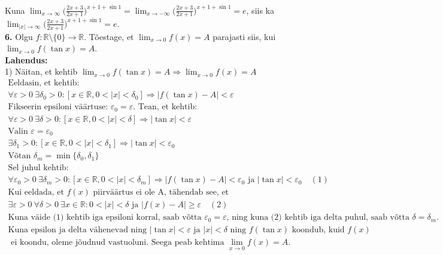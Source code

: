 \documentclass{article}
\begin{document}
Kuna $\displaystyle\lim_{x\to\infty} \bigg( \frac{2x+3}{2x+1}\bigg)^{x+1+\sin 1}= \displaystyle\lim_{x\to-\infty} \bigg( \frac{2x+3}{2x+1}\bigg)^{x+1+\sin 1}=e$, siis ka $\displaystyle\lim_{|x|\to\infty} \bigg( \frac{2x+3}{2x+1}\bigg)^{x+1+\sin 1}=e$.
\pagebreak\\
\textbf{6.} Olgu $f:\mathbb{R}\setminus \{0\}\to \mathbb{R}$. T\~oestage, et $\displaystyle\lim_{x\to0}f(x)=A$ parajasti siis, kui $\displaystyle\lim_{x\to0} f(\tan x)=A$.\\
\textbf{Lahendus:}\\
1) N\"aitan, et kehtib $\displaystyle\lim_{x\to0} f(\tan x)=A\Rightarrow\displaystyle\lim_{x\to0}f(x)=A$\\
\begin{gather*}
\text{Eeldasin, et kehtib:}\\
\forall \varepsilon>0\ \exists \delta_0>0:[x\in \mathbb{R}, 0<|x|<\delta_0]\Rightarrow |f(\tan x)-A|<\varepsilon\\
\text{Fikseerin epsiloni v\"a\"artuse: }\varepsilon_0=\varepsilon\text{. Tean, et kehtib:}\\
\forall \varepsilon>0\ \exists \delta>0:[x\in \mathbb{R}, 0<|x|<\delta]\Rightarrow |\tan x|<\varepsilon\\
\text{Valin }\varepsilon = \varepsilon_0\\
\exists \delta_1>0:[x\in \mathbb{R}, 0<|x|<\delta_1]\Rightarrow |\tan x|<\varepsilon_0\\
\text{V\~otan }\delta_m=\min\{\delta_0,\delta_1\}\\
\text{Sel juhul kehtib:}\\
\forall \varepsilon_0>0\ \exists \delta_m>0:[x\in \mathbb{R}, 0<|x|<\delta_m]\Rightarrow |f(\tan x)-A|<\varepsilon_0 \text{ ja }|\tan x|<\varepsilon_0\quad(1)\\
\text{Kui eeldada, et }f(x)\text{ piirv\"a\"artus ei ole A, t\"ahendab see, et}\\
\exists \varepsilon>0\ \forall \delta>0\ \exists x\in \mathbb{R}: 0<|x|<\delta \text{ ja }|f(x)-A|\geq\varepsilon\quad (2)\\
\text{Kuna v\"aide (1) kehtib iga epsiloni korral, saab v\~otta }\varepsilon_0=\varepsilon\text{, ning kuna (2) kehtib iga delta puhul, saab v\~otta }\delta=\delta_m.\\
\text{Kuna epsilon ja delta v\"ahenevad ning }|\tan x|<\varepsilon \text { ja }|x|<\delta\text { ning }f(\tan x)\text { koondub, kuid } f(x)\\
\text{ ei koondu, oleme j\~oudnud vastuoluni. Seega peab kehtima } \lim_{x\to0}f(x)=A.\\
\end{gather*}
\end{document}
